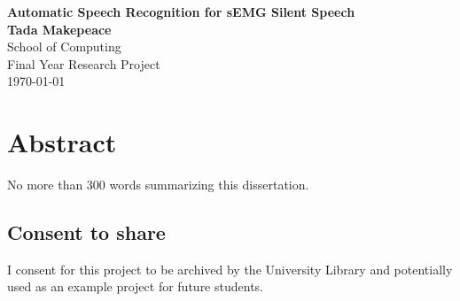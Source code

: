 \documentclass[12pt, a4paper]{report}
\begin{document}
\thispagestyle{empty}	%
\vspace*{1mm}	%
\vspace{10mm}

\begin{center}
\huge\textbf{\textsf{Automatic Speech Recognition for sEMG Silent Speech}}\\
\vspace{15mm}
\large \textbf{Tada Makepeace}\\


\vspace{10mm}
\normalsize School of Computing \\ Final Year Research Project \\

\vspace{20mm}
%
\today	%
\end{center}
\newpage
{}	%
\chapter*{Abstract}	%

No more than 300 words summarizing this dissertation.

\vspace{10mm}
\section*{Consent to share}
I consent for this project to be archived by the University Library and potentially used as an example project for future students.

\newpage
\renewcommand{\contentsname}{Table of Contents}	%
\tableofcontents
\end{document}
